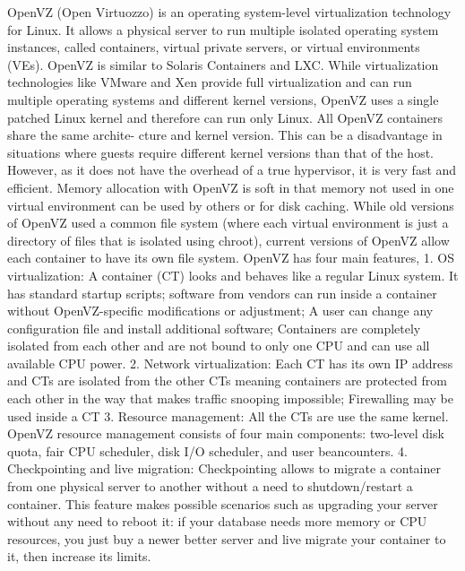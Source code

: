 {     OpenVZ (Open Virtuozzo) is an operating system-level
     virtualization technology for Linux. It allows a physical server
     to run multiple isolated operating system instances, called
     containers, virtual private servers, or virtual environments
     (VEs). OpenVZ is similar to Solaris Containers and
     LXC. \cite{www-openvz-3} While virtualization technologies like
     VMware and Xen provide full virtualization and can run multiple
     operating systems and different kernel versions, OpenVZ uses a
     single patched Linux kernel and therefore can run only Linux. All
     OpenVZ containers share the same archite- cture and kernel
     version. This can be a disadvantage in situations where guests
     require different kernel versions than that of the host. However,
     as it does not have the overhead of a true hypervisor, it is very
     fast and efficient. Memory allocation with OpenVZ is soft in that
     memory not used in one virtual environment can be used by others
     or for disk caching. \cite{www-openvz-2} While old versions of
     OpenVZ used a common file system (where each virtual environment
     is just a directory of files that is isolated using chroot),
     current versions of OpenVZ allow each container to have its own
     file system.  OpenVZ has four main features, \cite{www-openvz-1}
     1. OS virtualization: A container (CT) looks and behaves like a
     regular Linux system. It has standard startup scripts; software
     from vendors can run inside a container without OpenVZ-specific
     modifications or adjustment; A user can change any configuration
     file and install additional software; Containers are completely
     isolated from each other and are not bound to only one CPU and
     can use all available CPU power.
     2. Network virtualization: Each CT has its own IP address and CTs
     are isolated from the other CTs meaning containers are protected
     from each other in the way that makes traffic snooping
     impossible; Firewalling may be used inside a CT
     3. Resource management: All the CTs are use the same
     kernel. OpenVZ resource management consists of four main
     components: two-level disk quota, fair CPU scheduler, disk I/O
     scheduler, and user beancounters.
     4. Checkpointing and live migration: Checkpointing allows to
     migrate a container from one physical server to another without a
     need to shutdown/restart a container. This feature makes possible
     scenarios such as upgrading your server without any need to
     reboot it: if your database needs more memory or CPU resources,
     you just buy a newer better server and live migrate your
     container to it, then increase its limits.


}
